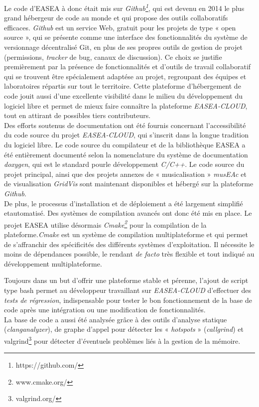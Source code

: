 \documentclass[french, 11pt]{memoir}
\begin{document}
\bigskip
Le code d'EASEA à donc était mis sur \emph{Github\footnote{https://github.com/}}, qui est devenu en
2014 le plus grand hébergeur de code au monde et qui propose des outils
collaboratifs efficaces. \emph{Github} est un service Web, gratuit pour
les projets de type « open source », qui se présente comme une interface
des fonctionnalités du système de versionnage décentralisé Git, en plus
de ses propres outils de gestion de projet (permissions, \emph{tracker}
de bug, canaux de discussion). Ce choix se justifie premièrement par la
présence de fonctionnalités et d'outils de travail collaboratif qui se
trouvent être spécialement adaptése au projet, regroupant des équipes et
laboratoires répartis sur tout le territoire. Cette plateforme
d'hébergement de code jouit aussi d'une excellente visibilité dans le
milieu du développement du logiciel libre et permet de mieux faire
connaître la plateforme \emph{EASEA-CLOUD}, tout en attirant de
possibles tiers contributeurs. \\
Des efforts soutenus de documentation ont été fournis concernant
l'accessibilité du code source du projet \emph{EASEA-CLOUD}, qui
s'inscrit dans la longue tradition du logiciel libre. Le code source du
compilateur et de la bibliothèque EASEA a été entièrement documenté selon
la nomenclature du système de documentation \emph{doxygen}, qui est le
standard pourle développement \emph{C/C++}. Le code source du projet
principal, ainsi que des projets annexes de « musicalisation »
\emph{musEAc} et de visualisation \emph{GridVis} sont maintenant
disponibles et hébergé sur la plateforme \emph{Github}. \\
De plus, le processus d'installation et de déploiement a été largement
simplifié etautomatisé. Des systèmes de compilation avancés ont donc été
mis en place. Le projet EASEA utilise désormais \emph{Cmake\footnote{www.cmake.org/}} pour la
compilation de la plateforme.\emph{Cmake} est un système de compilation
multiplateforme et qui permet de s'affranchir des spécificités des
différents systèmes d'exploitation. Il nécessite le moins de dépendances
possible, le rendant \emph{de facto} très flexible et tout indiqué au
développement multiplateforme.

\bigskip
Toujours dans un but d'offrir une plateforme stable et pérenne, l'ajout
de script type bash permet au développeur travaillant sur
\emph{EASEA-CLOUD} d'effectuer des \textit{tests de régression},
indispensable pour tester le bon fonctionnement de la base de code après
une intégration ou une modification de fonctionnalités. \\
La base de code a
aussi été analysée grâce à des outils d'analyse statique
(\textit{clanganalyzer}), de graphe d'appel pour détecter les « \textit{hotspots}
» (\emph{callgrind}) et valgrind\footnote{valgrind.org/} pour détecter d'éventuels problèmes
liés à la gestion de la mémoire.
\end{document}
